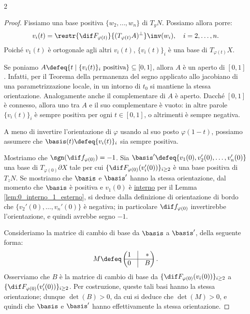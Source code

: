 \begin{multicols*}{2}
\begin{proof}
        Fissiamo una base positiva $\{w_2, \ldots, w_n\}$ di $T_y N$. Possiamo allora porre:
        \[
            v_i(t) = \restr{\dif F_{\varphi(t)}}{(T_{\varphi(t)} A)^\perp}\inv(w_i), \quad i = 2, \ldots, n.
        \]
        Poiché $v_1(t)$ è ortogonale agli altri $v_i(t)$, $\{v_i(t)\}_i$ è una base
        di $T_{\varphi(t)} X$. \smallskip

        Se poniamo $A \defeq \{t \mid \{v_i(t)\}_i \text{ positiva}\} \subseteq [0, 1]$,
        allora $A$ è un aperto di $[0, 1]$. Infatti, per il Teorema della permanenza del segno applicato
        allo jacobiano di una parametrizzazione locale, in un
        intorno di $t_0$ si mantiene la stessa orientazione.
        Analogamente anche il complementare
        di $A$ è aperto. Dacché $[0, 1]$ è connesso, allora uno tra $A$ e il suo complementare è vuoto: in altre
        parole $\{v_i(t)\}_i$ è sempre positiva per ogni $t \in [0, 1]$, o altrimenti è sempre negativa. \smallskip

        A meno di invertire l'orientazione di $\varphi$ usando al suo posto $\varphi(1 - t)$, possiamo
        assumere che $\basis(t) \defeq \{v_i(t)\}_i$ sia sempre positiva. \smallskip

        Mostriamo che $\sgn(\dif f_{\varphi(0)}) = -1$. Sia $\basis' \defeq \{v_1(0), v_2'(0), \ldots, v_n'(0)\}$
        una base di $T_{\varphi(0)} \partial X$ tale per cui $\{ \dif F_{\varphi(0)} (v_i'(0)) \}_{i \geq 2} $ è
        una base positiva di $T_z N$. Se mostriamo che $\basis$ e $\basis'$ hanno la stessa orientazione,
        dal momento che $\basis$ è positiva e $v_1(0)$ è \underline{interno} per il Lemma \ref{lem:0_interno_1_esterno},
        si deduce dalla definizione di orientazione di bordo che
        $\{ v_2'(0), \ldots, v_n'(0)\}$ è negativa; in particolare $\dif f_{\varphi(0)}$ invertirebbe l'orientazione,
        e quindi avrebbe segno $-1$. \smallskip

        Consideriamo la matrice di cambio di base da $\basis$ a $\basis'$, della seguente forma:
        \[
            M \defeq \begin{pmatrix}
                1 & \vline & * \\
                \hline
                0 & \vline & B
            \end{pmatrix}.
        \]
        Osserviamo che $B$ è la matrice di cambio di base da $\{ \dif F_{\varphi(0)} (v_i(0)) \}_{i \geq 2}$ a $\{ \dif F_{\varphi(0)} (v_i'(0)) \}_{i \geq 2}$.
        Per costruzione, queste tali basi hanno la stessa orientazione; dunque
        $\det(B) > 0$, da cui si deduce che $\det(M) > 0$, e quindi che $\basis$ e
        $\basis'$ hanno effettivamente la stessa orientazione. \smallskip


\end{proof}
\end{multicols*}
